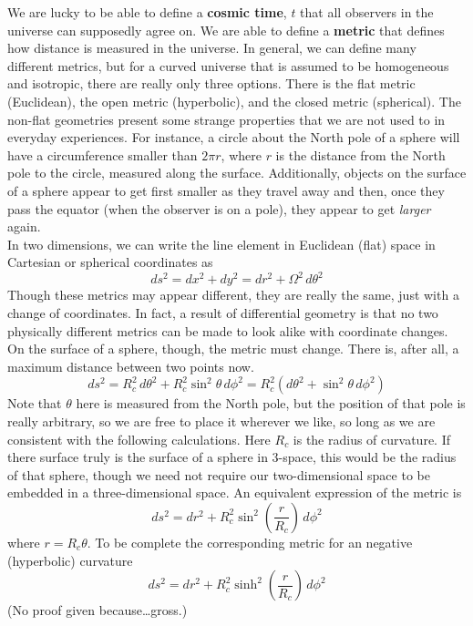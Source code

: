 \documentclass[10pt]{article}
\numberwithin{equation}{section}
\newcommand{\n}{\noindent}
\begin{document}
	\n We are lucky to be able to define a \textbf{cosmic time}, $t$ that all observers in the universe can supposedly agree on. We are able to define a \textbf{metric} that defines how distance is measured in the universe. In general, we can define many different metrics, but for a curved universe that is assumed to be homogeneous and isotropic, there are really only three options. There is the flat metric (Euclidean), the open metric (hyperbolic), and the closed metric (spherical). The non-flat geometries present some strange properties that we are not used to in everyday experiences. For instance, a circle about the North pole of a sphere will have a circumference smaller than $2\pi r$, where $r$ is the distance from the North pole to the circle, measured along the surface. Additionally, objects on the surface of a sphere appear to get first smaller as they travel away and then, once they pass the equator (when the observer is on a pole), they appear to get \emph{larger} again.\\
	
	\n In two dimensions, we can write the line element in Euclidean (flat) space in Cartesian or spherical coordinates as
	\begin{equation}
		\label{eq:geo:1}
		ds^2 = dx^2+ dy^2 = dr^2 + \Omega^2\,d\theta^2
	\end{equation}
	Though these metrics may appear different, they are really the same, just with a change of coordinates. In fact, a result of differential geometry is that no two physically different metrics can be made to look alike with coordinate changes. On the surface of a sphere, though, the metric must change. There is, after all, a maximum distance between two points now. 
	\begin{equation}
		\label{eq:geo:2} ds^2 = R_c^2\,d\theta^2 + R_c^2\sin^2\theta\,d\phi^2 = R_c^2\left(d\theta^2 + \sin^2\theta\,d\phi^2\right)
	\end{equation}
	Note that $\theta$ here is measured from the North pole, but the position of that pole is really arbitrary, so we are free to place it wherever we like, so long as we are consistent with the following calculations. Here $R_c$ is the radius of curvature. If there surface truly is the surface of a sphere in 3-space, this would be the radius of that sphere, though we need not require our two-dimensional space to be embedded in a three-dimensional space. An equivalent expression of the metric is
	\begin{equation}
		\label{eq:geo:3} ds^2 = dr^2 + R_c^2\sin^2\left(\frac{r}{R_c}\right)\,d\phi^2
	\end{equation}
	where $r=R_c\theta$. To be complete the corresponding metric for an negative (hyperbolic) curvature
	\begin{equation}
		\label{eq:geo:4} ds^2 = dr^2 + R_c^2\sinh^2\left(\frac{r}{R_c}\right)\,d\phi^2
	\end{equation}
	(No proof given because\ldots gross.)\\
	
\end{document}
